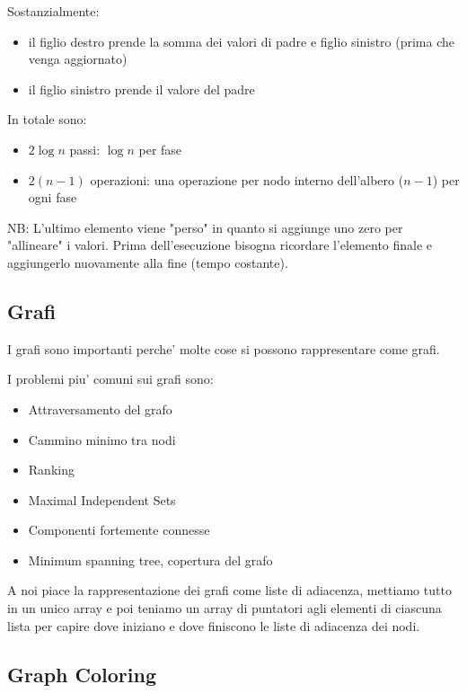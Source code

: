 Sostanzialmente: 
\begin{itemize}
    \item il figlio destro prende la somma dei valori di padre e figlio sinistro (prima che venga aggiornato)
    
    \item il figlio sinistro prende il valore del padre
\end{itemize}

In totale sono:
\begin{itemize}
    \item $2 \log n$ passi: $\log n$ per fase
    
    \item $2 (n-1)$ operazioni: una operazione per nodo interno dell'albero ($n-1$) per ogni fase
\end{itemize}

NB: L'ultimo elemento viene "perso" in quanto si aggiunge uno zero per "allineare" i valori. Prima dell'esecuzione bisogna ricordare l'elemento finale e aggiungerlo nuovamente alla fine (tempo costante).

\subsection{Grafi}
I grafi sono importanti perche' molte cose si possono rappresentare come grafi.

I problemi piu' comuni sui grafi sono:
\begin{itemize}
    \item Attraversamento del grafo
    \item Cammino minimo tra nodi
    \item Ranking
    \item Maximal Independent Sets 
    \item Componenti fortemente connesse
    \item Minimum spanning tree, copertura del grafo
\end{itemize}

A noi piace la rappresentazione dei grafi come liste di adiacenza, mettiamo tutto in un unico array e poi teniamo un array di puntatori agli elementi di ciascuna lista per capire dove iniziano e dove finiscono le liste di adiacenza dei nodi.

\subsection{Graph Coloring}

